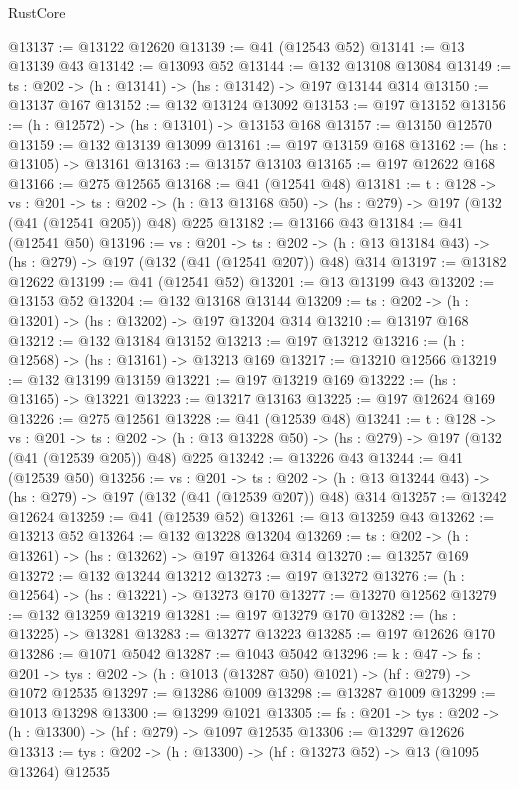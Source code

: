 \begin{lexlean}{RustCore}
\begin{coremodule}
@13137 := @13122 @12620
@13139 := @41 (@12543 @52)
@13141 := @13 @13139 @43
@13142 := @13093 @52
@13144 := @132 @13108 @13084
@13149 := {ts : @202} -> (h : @13141) -> (hs : @13142) -> @197 @13144 @314
@13150 := @13137 @167
@13152 := @132 @13124 @13092
@13153 := @197 @13152
@13156 := (h : @12572) -> (hs : @13101) -> @13153 @168
@13157 := @13150 @12570
@13159 := @132 @13139 @13099
@13161 := @197 @13159 @168
@13162 := (hs : @13105) -> @13161
@13163 := @13157 @13103
@13165 := @197 @12622 @168
@13166 := @275 @12565
@13168 := @41 (@12541 @48)
@13181 := {t : @128} ->
  {vs : @201} ->
  {ts : @202} -> (h : @13 @13168 @50) -> (hs : @279) -> @197 (@132 (@41 (@12541 @205)) @48) @225
@13182 := @13166 @43
@13184 := @41 (@12541 @50)
@13196 := {vs : @201} ->
  {ts : @202} -> (h : @13 @13184 @43) -> (hs : @279) -> @197 (@132 (@41 (@12541 @207)) @48) @314
@13197 := @13182 @12622
@13199 := @41 (@12541 @52)
@13201 := @13 @13199 @43
@13202 := @13153 @52
@13204 := @132 @13168 @13144
@13209 := {ts : @202} -> (h : @13201) -> (hs : @13202) -> @197 @13204 @314
@13210 := @13197 @168
@13212 := @132 @13184 @13152
@13213 := @197 @13212
@13216 := (h : @12568) -> (hs : @13161) -> @13213 @169
@13217 := @13210 @12566
@13219 := @132 @13199 @13159
@13221 := @197 @13219 @169
@13222 := (hs : @13165) -> @13221
@13223 := @13217 @13163
@13225 := @197 @12624 @169
@13226 := @275 @12561
@13228 := @41 (@12539 @48)
@13241 := {t : @128} ->
  {vs : @201} ->
  {ts : @202} -> (h : @13 @13228 @50) -> (hs : @279) -> @197 (@132 (@41 (@12539 @205)) @48) @225
@13242 := @13226 @43
@13244 := @41 (@12539 @50)
@13256 := {vs : @201} ->
  {ts : @202} -> (h : @13 @13244 @43) -> (hs : @279) -> @197 (@132 (@41 (@12539 @207)) @48) @314
@13257 := @13242 @12624
@13259 := @41 (@12539 @52)
@13261 := @13 @13259 @43
@13262 := @13213 @52
@13264 := @132 @13228 @13204
@13269 := {ts : @202} -> (h : @13261) -> (hs : @13262) -> @197 @13264 @314
@13270 := @13257 @169
@13272 := @132 @13244 @13212
@13273 := @197 @13272
@13276 := (h : @12564) -> (hs : @13221) -> @13273 @170
@13277 := @13270 @12562
@13279 := @132 @13259 @13219
@13281 := @197 @13279 @170
@13282 := (hs : @13225) -> @13281
@13283 := @13277 @13223
@13285 := @197 @12626 @170
@13286 := @1071 @5042
@13287 := @1043 @5042
@13296 := {k : @47} ->
  {fs : @201} -> {tys : @202} -> (h : @1013 (@13287 @50) @1021) -> (hf : @279) -> @1072 @12535
@13297 := @13286 @1009
@13298 := @13287 @1009
@13299 := @1013 @13298
@13300 := @13299 @1021
@13305 := {fs : @201} -> {tys : @202} -> (h : @13300) -> (hf : @279) -> @1097 @12535
@13306 := @13297 @12626
@13313 := {tys : @202} -> (h : @13300) -> (hf : @13273 @52) -> @13 (@1095 @13264) @12535

\end{coremodule}
\end{lexlean}
